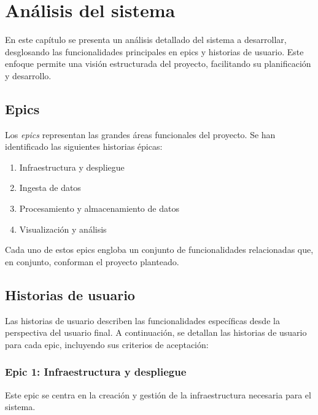\chapter{Análisis del sistema}
En este capítulo se presenta un análisis detallado del sistema a desarrollar,
desglosando las funcionalidades principales en epics y historias de usuario.
Este enfoque permite una visión estructurada del proyecto, facilitando su
planificación y desarrollo.

\section{Epics}
Los \textit{epics} representan las grandes áreas funcionales del proyecto.
Se han identificado las siguientes historias épicas:

\begin{enumerate}
    \item Infraestructura y despliegue
    \item Ingesta de datos
    \item Procesamiento y almacenamiento de datos
    \item Visualización y análisis
\end{enumerate}

Cada uno de estos epics engloba un conjunto de funcionalidades relacionadas
que, en conjunto, conforman el proyecto planteado.

\newpage{}
\section{Historias de usuario}
Las historias de usuario describen las funcionalidades específicas desde la
perspectiva del usuario final. A continuación, se detallan las historias de
usuario para cada epic, incluyendo sus criterios de aceptación:


\subsection{Epic 1: Infraestructura y despliegue}
Este epic se centra en la creación y gestión de la infraestructura necesaria
para el sistema.

